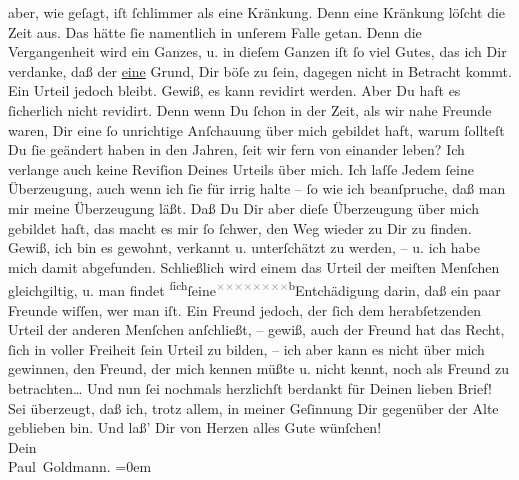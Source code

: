 \begin{ledgroupsized}[t]{13cm}
               aber, wie geſagt, {\pb}iſt ſchlimmer als eine
               Kränkung. Denn eine Kränkung löſcht die Zeit aus. Das hätte ſie namentlich in unſerem
               Falle getan. \strikeout{\textcolor{gray}{×}} Denn die Vergangenheit wird ein Ganzes, u. in dieſem Ganzen iſt ſo viel Gutes,
               das ich Dir verdanke, daß der \uline{eine} Grund, Dir böſe zu
               ſein, dagegen nicht in Betracht kommt.\pend
           \pstart
           Ein Urteil jedoch bleibt. Gewiß, es kann revidirt werden. Aber Du haft es ſicherlich
               nicht revidirt. Denn wenn Du ſchon in der Zeit, als wir nahe Freunde waren, Dir eine
               ſo unrichtige Anſchauung über mich {\pb}gebildet
               haft, warum ſollteſt Du ſie geändert haben in den Jahren, ſeit wir fern von einander
               leben? Ich verlange auch keine Reviſion Deines Urteils über mich. Ich laſſe Jedem
               ſeine Überzeugung, auch wenn ich ſie für irrig halte – ſo wie ich beanſpruche, daß
               man mir meine Überzeugung läßt. Daß Du Dir aber dieſe Überzeugung über mich gebildet
               haſt, das macht es mir ſo ſchwer, den Weg wieder zu Dir zu finden. Gewiß, ich bin es
               gewohnt, verkannt u. unterſchätzt {\pb}zu werden, –
               u. ich habe mich damit abgefunden. Schließlich wird einem das Urteil der meiſten
               Menſchen gleichgiltig, u. man findet \substVorne{}\textsuperscript{ſich}\substDazwischen{}ſeine\substHinten{}{ }\substVorne{}\textsuperscript{\textcolor{gray}{×}\-\textcolor{gray}{×}\-\textcolor{gray}{×}\-\textcolor{gray}{×}\-\textcolor{gray}{×}\-\textcolor{gray}{×}\-\textcolor{gray}{×}\-\textcolor{gray}{×}b}\substDazwischen{}Entchädigung darin\substHinten{}, daß ein paar Freunde wiſſen, wer man iſt. Ein Freund jedoch, \strikeout{, \textcolor{gray}{der}}{ } der ſich dem herabſetzenden Urteil der anderen Menſchen anſchließt, – gewiß,
               auch der Freund hat das Recht, ſich in voller Freiheit ſein Urteil zu bilden, – ich
               aber kann es nicht über mich {\pb}gewinnen, den
               Freund, der mich kennen müßte u. nicht kennt, noch als Freund zu betrachten{\dots}\pend
           \pstart
           Und nun ſei nochmals herzlichſt berdankt für Deinen lieben Brief! Sei überzeugt,
               daß ich, trotz allem, in meiner Geſinnung Dir gegenüber der Alte geblieben bin. Und
               laß’ Dir von Herzen alles Gute wünſchen! {\\[\baselineskip]}Dein {\\[\baselineskip]}\spacefill\mbox{Paul Goldmann.}\pend
           \leftskip=0em{}
         
         \endnumbering{}\end{ledgroupsized}\begin{anhang}\end{anhang}\newcommand{\dateiname}{L03478}\newcommand{\titel}{Paul Goldmann an Arthur Schnitzler, 16. 2. 1925}\newcommand{\editorInnen}{Martin Anton Müller und Laura Untner}
      